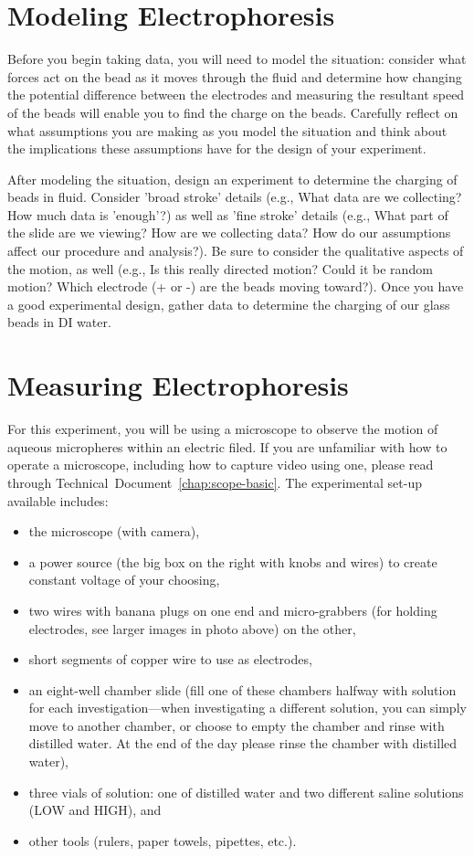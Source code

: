 \section{Modeling Electrophoresis}
Before you begin taking data, you will need to model the situation: consider what forces act on the bead as it moves through the fluid and determine how changing the potential difference between the electrodes and measuring the resultant speed of the beads will enable you to find the charge on the beads. 
Carefully reflect on what assumptions you are making as you model the situation and think about the implications these assumptions have for the design of your experiment.
\par 
After modeling the situation, design an experiment to determine the charging of beads in fluid. 
Consider 'broad stroke' details (e.g., What data are we collecting? How much data is 'enough'?) as well as 'fine stroke' details (e.g., What part of the slide are we viewing? How are we collecting data? How do our assumptions affect our procedure and analysis?). 
Be sure to consider the qualitative aspects of the motion, as well (e.g., Is this really directed motion? Could it be random motion? Which electrode (+ or -) are the beads moving toward?). 
Once you have a good experimental design, gather data to determine the charging of our glass beads in DI water.

\section{Measuring Electrophoresis}
For this experiment, you will be using a microscope to observe the motion of aqueous micropheres within an electric filed. If you are unfamiliar with how to operate a microscope, including how to capture video using one, please read through Technical~Document~\ref{chap:scope-basic}. The experimental set-up available includes:
\begin{itemize}
\itemsep-0.3em
\item the microscope (with camera),
\item a power source (the big box on the right with knobs and wires) to create constant voltage of your choosing,
\item two wires with banana plugs on one end and micro-grabbers (for holding electrodes, see larger images in photo above) on the other,
\item short segments of copper wire to use as electrodes,
\item an eight-well chamber slide (fill one of these chambers halfway with solution for each investigation—when investigating a different solution, you can simply move to another chamber, or choose to empty the chamber and rinse with distilled water. At the end of the day please rinse the chamber with distilled water),
\item three vials of solution: one of distilled water and two different saline solutions (LOW and HIGH), and
\item other tools (rulers, paper towels, pipettes, etc.).
\end{itemize}

